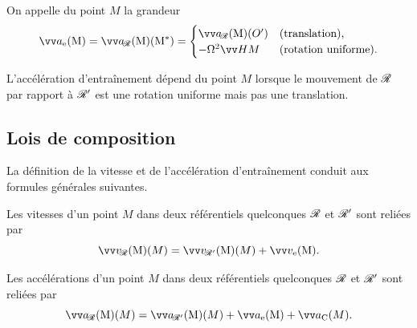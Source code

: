 \documentclass[12pt,fancy]{cours}
\begin{document}
\begin{definition}\label{def:ae}
On appelle  du point $M$ la grandeur
\begin{equation*}
\ae  = \aR(\PC) 
=
 \begin{cases}
\aR(O') & \text{(translation),}\\
- \Omega^2 \Vec{HM} & \text{(rotation uniforme).}
\end{cases}
\end{equation*}
\end{definition}
L'accélération d'entraînement dépend du point $M$ lorsque le mouvement de $\mathcal{R}$ par rapport à $\mathcal{R}'$ est une rotation uniforme mais pas une translation.

\subsection{Lois de composition}

La définition de la vitesse et de l'accélération d'entraînement conduit aux formules générales suivantes.

\begin{theorem}\label{form:compov}
Les vitesses d'un point $M$ dans deux référentiels quelconques $\mathcal{R}$ et $\mathcal{R}'$ sont reliées par
\begin{equation*}
\vR(M) = \vRp(M) + \ve.
\end{equation*}
\end{theorem}

\begin{theorem}\label{form:compoa}
Les accélérations d'un point $M$ dans deux référentiels quelconques $\mathcal{R}$ et $\mathcal{R}'$ sont reliées par
\begin{equation*}
\aR(M) = \aRp(M) +  \ae + \aC.
\end{equation*}
\end{theorem}
\end{document}
